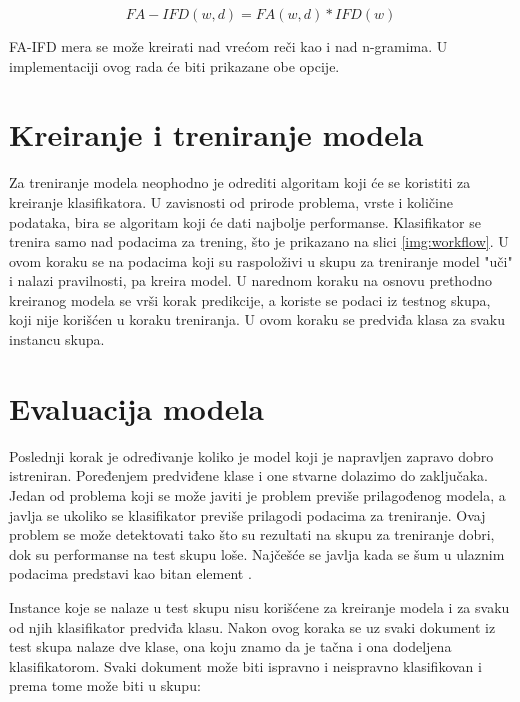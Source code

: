 \documentclass[12pt,oneside]{memoir}
\begin{document}
\begin{equation}
	FA-IFD(w, d) = FA(w,d) * IFD(w)
\end{equation}

FA-IFD mera se može kreirati nad vrećom reči kao i nad n-gramima.  U implementaciji ovog rada će biti prikazane obe opcije.

\section{Kreiranje i treniranje modela}

Za treniranje modela neophodno je odrediti algoritam koji će se koristiti za kreiranje klasifikatora. U zavisnosti od prirode problema, vrste i količine podataka, bira se algoritam koji će dati najbolje performanse. Klasifikator se trenira samo nad podacima za trening, što je prikazano na slici \ref{img:workflow}. U ovom koraku se na podacima koji su raspoloživi u skupu za treniranje model "uči" i nalazi pravilnosti, pa kreira model. U narednom koraku na osnovu prethodno kreiranog modela se vrši korak predikcije, a koriste se podaci iz testnog skupa, koji nije korišćen u koraku treniranja. U ovom koraku se predviđa klasa za svaku instancu skupa. 

\section{Evaluacija modela}

Poslednji korak je određivanje koliko je model koji je napravljen zapravo dobro istreniran. Poređenjem predviđene klase i one stvarne dolazimo do zaključaka. Jedan od problema koji se može javiti je problem previše prilagođenog modela, a javlja se ukoliko se klasifikator previše prilagodi podacima za treniranje. Ovaj problem se može detektovati tako što su rezultati na skupu za treniranje dobri, dok su performanse na test skupu loše.  Najčešće se javlja kada se šum u ulaznim podacima predstavi kao bitan element \cite{JelenaPHD}.

Instance koje se nalaze u test skupu nisu korišćene za kreiranje modela i za svaku od njih klasifikator predviđa klasu. Nakon ovog koraka se uz svaki dokument iz test skupa nalaze dve klase, ona koju znamo da je tačna i ona dodeljena klasifikatorom. Svaki dokument može biti ispravno i neispravno klasifikovan i prema tome može biti u skupu:
\end{document}
